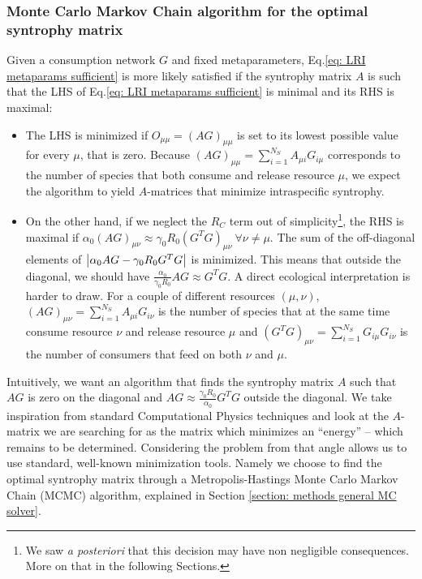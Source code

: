 \documentclass[12pt, titlepage]{report}
\begin{document}
\subsubsection{Monte Carlo Markov Chain algorithm for the optimal syntrophy matrix} \label{section: methods LRI MC solver}

Given a consumption network $G$ and fixed metaparameters, Eq.\eqref{eq: LRI metaparams sufficient} is more likely satisfied if the syntrophy matrix $A$ is such that the LHS of Eq.\eqref{eq: LRI metaparams sufficient} is minimal and its RHS is maximal:
\begin{itemize}
\item The LHS is minimized if $O_{\mu\mu}=(AG)_{\mu\mu}$ is set to its lowest possible value for every $\mu$, that is zero. Because $(AG)_{\mu\mu}=\sum_{i=1}^{N_S} A_{\mu i} G_{i\mu}$ corresponds to the number of species that both consume and release resource $\mu$, we expect the algorithm to yield $A$-matrices that minimize intraspecific syntrophy.
\item On the other hand, if we neglect the $R_C$ term out of simplicity\footnote{We saw \textit{a posteriori} that this decision may have non negligible consequences. More on that in the following Sections.}, the RHS is maximal if $\alpha_0(AG)_{\mu\nu}\approx\gamma_0R_0 (G^TG)_{\mu\nu} \ \forall \nu\neq\mu$. The sum of the off-diagonal elements of $\left|{\alpha_0 AG-\gamma_0 R_0 G^T G}\right|$ is minimized. This means that outside the diagonal, we should have $\frac{\alpha_0}{\gamma_0 R_0} AG \approx  G^T G$. A direct ecological interpretation is harder to draw. For a couple of different resources $(\mu,\nu)$,  $(AG)_{\mu\nu}=\sum_{i=1}^{N_S} A_{\mu i} G_{i\nu}$ is the number of species that at the same time consume resource $\nu$ and release resource $\mu$ and $(G^TG)_{\mu\nu}=\sum_{i=1}^{N_S} G_{i\mu}G_{i\nu}$ is the number of consumers that feed on both $\nu$ and $\mu$.

\end{itemize}
Intuitively, we want an algorithm that finds the syntrophy matrix $A$ such that $AG$ is zero on the diagonal and $AG \approx \frac{\gamma_0R_0}{\alpha_0}G^TG$ outside the diagonal. We take inspiration from standard Computational Physics techniques and look at the $A$-matrix we are searching for as the matrix which minimizes an ``energy'' -- which remains to be determined. Considering the problem from that angle allows us to use standard, well-known minimization tools. Namely we choose to find the optimal syntrophy matrix through a Metropolis-Hastings Monte Carlo Markov Chain (MCMC) algorithm, explained in Section \ref{section: methods general MC solver}.
\end{document}
